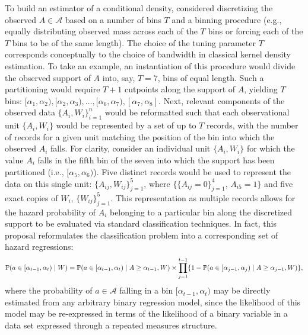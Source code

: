To build an estimator of a conditional density, \citet{diaz2011super} considered
discretizing the observed $A \in \mathcal{A}$ based on a number of bins $T$ and
a binning procedure (e.g., equally distributing observed mass across each of the
$T$ bins or forcing each of the $T$ bins to be of the same length). The choice
of the tuning parameter $T$ corresponds conceptually to the choice of bandwidth
in classical kernel density estimation. To take an example, an instantiation of
this procedure would divide the observed support of $A$ into, say, $T = 7$, bins
of equal length. Such a partitioning would require $T + 1$ cutpoints along
the support of $A$, yielding $T$ bins: $[\alpha_1, \alpha_2), [\alpha_2,
\alpha_3), \ldots, [\alpha_6, \alpha_7), [\alpha_7, \alpha_8]$. Next, relevant
components of the observed data $\{A_i, W_i\}_{i=1}^n$ would be reformatted such
that each observational unit $\{A_i, W_i\}$ would be represented by a set of up
to $T$ records, with the number of records for a given unit matching the
position of the bin into which the observed $A_i$ falls. For clarity, consider
an individual unit $\{A_i, W_i\}$ for which the value $A_i$ falls in the fifth
bin of the seven into which the support has been partitioned (i.e., $[\alpha_5,
\alpha_6)$). Five distinct records would be used to represent the data on this
single unit: $\{A_{ij}, W_{ij}\}_{j=1}^5$, where $\{\{A_{ij} = 0\}_{j=1}^4$,
$A_{i5} = 1\}$ and five exact copies of $W_i$, $\{W_{ij}\}_{j=1}^5$. This
representation as multiple records allows for the hazard probability of $A_i$
belonging to a particular bin along the discretized support to be evaluated via
standard classification techniques. In fact, this proposal reformulates the
classification problem into a corresponding set of hazard regressions:
\begin{equation*}
   \mathbb{P} (a \in [\alpha_{t-1}, \alpha_t) \mid W) = \mathbb{P} (a \in [\alpha_{t-1},
   \alpha_t) \mid A \geq \alpha_{t-1}, W) \times  \prod_{j = 1}^{t -1} \{1
   - \mathbb{P} (a \in [\alpha_{j-1}, \alpha_j) \mid A
   \geq \alpha_{j-1}, W) \},
\end{equation*}
where the probability of $a \in \mathcal{A}$ falling in a bin $[\alpha_{t-1},
\alpha_t)$ may be directly estimated from any arbitrary binary regression model,
since the likelihood of this model may be re-expressed in terms of the
likelihood of a binary variable in a data set expressed through a repeated
measures structure.

